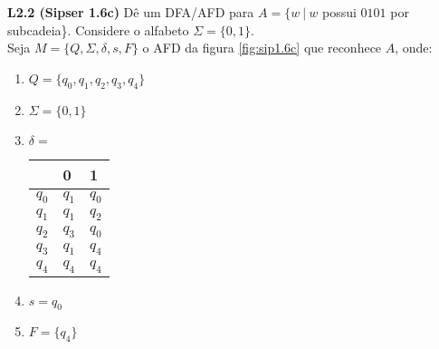 
\noindent \textbf{L2.2 (Sipser 1.6c)} Dê um DFA/AFD para $A = \{w \ |\ w$ possui $0101$ por subcadeia\}. Considere o alfabeto $\Sigma = \{0, 1\}$.\\[3pt]
Seja $M = \{Q, \Sigma, \delta, s, F\}$ o AFD da figura \ref{fig:sip1.6c} que reconhece $A$, onde:
\begin{enumerate}[label=\textbf{\arabic*}]
    \item $Q = \{q_0, q_1, q_2, q_3, q_4\}$
    \item $\Sigma = \{0, 1\}$
    \item $\delta = $
        \begin{table}[!ht]
        \centering
        \begin{tabular}{l|l|l}
                & 0         & 1     \\ \hline
        $q_0$   & $q_1$     & $q_0$ \\
        $q_1$   & $q_1$     & $q_2$ \\
        $q_2$   & $q_3$     & $q_0$ \\
        $q_3$   & $q_1$     & $q_4$ \\
        $q_4$   & $q_4$     & $q_4$
        \end{tabular}
        \end{table}
    \item $s = q_0$
    \item $F = \{q_4\}$
\end{enumerate}

